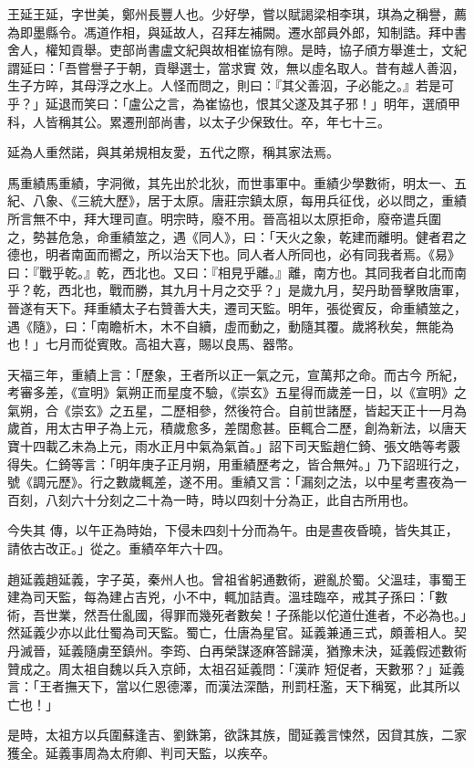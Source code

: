 \begin{pinyinscope}
 王延王延，字世美，鄭州長豐人也。少好學，嘗以賦謁梁相李琪，琪為之稱譽，薦為即墨縣令。馮道作相，與延故人，召拜左補闕。遷水部員外郎，知制誥。拜中書舍人，權知貢舉。吏部尚書盧文紀與故相崔協有隙。是時，協子頎方舉進士，文紀謂延曰：「吾嘗譽子于朝，貢舉選士，當求實
 效，無以虛名取人。昔有越人善泅，生子方晬，其母浮之水上。人怪而問之，則曰：『其父善泅，子必能之。』若是可乎？」延退而笑曰：「盧公之言，為崔協也，恨其父遂及其子邪！」明年，選頎甲科，人皆稱其公。累遷刑部尚書，以太子少保致仕。卒，年七十三。



 延為人重然諾，與其弟規相友愛，五代之際，稱其家法焉。



 馬重績馬重績，字洞微，其先出於北狄，而世事軍中。重績少學數術，明太一、五紀、八象、《三統大歷》，居于太原。唐莊宗鎮太原，每用兵征伐，必以問之，重績所言無不中，拜大理司直。明宗時，廢不用。晉高祖以太原拒命，廢帝遣兵圍
 之，勢甚危急，命重績筮之，遇《同人》，曰：「天火之象，乾建而離明。健者君之德也，明者南面而嚮之，所以治天下也。同人者人所同也，必有同我者焉。《易》曰：『戰乎乾。』乾，西北也。又曰：『相見乎離。』離，南方也。其同我者自北而南乎？乾，西北也，戰而勝，其九月十月之交乎？」是歲九月，契丹助晉擊敗唐軍，晉遂有天下。拜重績太子右贊善大夫，遷司天監。明年，張從賓反，命重績筮之，遇《隨》，曰：「南瞻析木，木不自續，虛而動之，動隨其覆。歲將秋矣，無能為也！」七月而從賓敗。高祖大喜，賜以良馬、器幣。



 天福三年，重績上言：「歷象，王者所以正一氣之元，宣萬邦之命。而古今
 所紀，考審多差，《宣明》氣朔正而星度不驗，《崇玄》五星得而歲差一日，以《宣明》之氣朔，合《崇玄》之五星，二歷相參，然後符合。自前世諸歷，皆起天正十一月為歲首，用太古甲子為上元，積歲愈多，差闊愈甚。臣輒合二歷，創為新法，以唐天寶十四載乙未為上元，雨水正月中氣為氣首。」詔下司天監趙仁錡、張文皓等考覈得失。仁錡等言：「明年庚子正月朔，用重績歷考之，皆合無舛。」乃下詔班行之，號《調元歷》。行之數歲輒差，遂不用。重績又言：「漏刻之法，以中星考晝夜為一百刻，八刻六十分刻之二十為一時，時以四刻十分為正，此自古所用也。



 今失其
 傳，以午正為時始，下侵未四刻十分而為午。由是晝夜昏曉，皆失其正，請依古改正。」從之。重績卒年六十四。



 趙延義趙延義，字子英，秦州人也。曾祖省躬通數術，避亂於蜀。父溫珪，事蜀王建為司天監，每為建占吉兇，小不中，輒加詰責。溫珪臨卒，戒其子孫曰：「數術，吾世業，然吾仕亂國，得罪而幾死者數矣！子孫能以佗道仕進者，不必為也。」然延義少亦以此仕蜀為司天監。蜀亡，仕唐為星官。延義兼通三式，頗善相人。契丹滅晉，延義隨虜至鎮州。李筠、白再榮謀逐麻答歸漢，猶豫未決，延義假述數術贊成之。周太祖自魏以兵入京師，太祖召延義問：「漢祚
 短促者，天數邪？」延義言：「王者撫天下，當以仁恩德澤，而漢法深酷，刑罰枉濫，天下稱冤，此其所以亡也！」



 是時，太祖方以兵圍蘇逢吉、劉銖第，欲誅其族，聞延義言悚然，因貸其族，二家獲全。延義事周為太府卿、判司天監，以疾卒。



\end{pinyinscope}